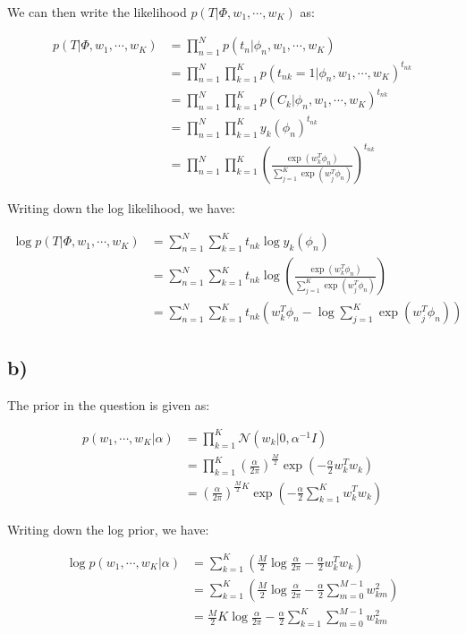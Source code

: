 \documentclass[12pt,a4paper,oneside]{paper}
\begin{document}
We can then write the likelihood $p(T | \Phi, w_1, \cdots, w_K)$ as:

\begin{align*}
    p(T | \Phi, w_1, \cdots, w_K) &= \prod_{n=1}^{N} p(t_n | \phi_n, w_1, \cdots, w_K) \\
    &= \prod_{n=1}^{N} \prod_{k=1}^{K} p(t_{nk} = 1 | \phi_n, w_1, \cdots, w_K)^{t_{nk}} \\
    &= \prod_{n=1}^{N} \prod_{k=1}^{K} p(C_k | \phi_n, w_1, \cdots, w_K)^{t_{nk}} \\
    &= \prod_{n=1}^{N} \prod_{k=1}^{K} y_k(\phi_n)^{t_{nk}} \\
    &= \prod_{n=1}^{N} \prod_{k=1}^{K} \left(\frac{\exp(w_k^T \phi_n)}{\sum_{j=1}^{K} \exp(w_j^T \phi_n)}\right)^{t_{nk}}
\end{align*}

Writing down the log likelihood, we have:

\begin{align*}
    \log p(T | \Phi, w_1, \cdots, w_K) &= \sum_{n=1}^{N} \sum_{k=1}^{K} t_{nk} \log y_k(\phi_n) \\
    &= \sum_{n=1}^{N} \sum_{k=1}^{K} t_{nk} \log \left(\frac{\exp(w_k^T \phi_n)}{\sum_{j=1}^{K} \exp(w_j^T \phi_n)}\right) \\
    &= \sum_{n=1}^{N} \sum_{k=1}^{K} t_{nk} \left(w_k^T \phi_n - \log \sum_{j=1}^{K} \exp(w_j^T \phi_n)\right)
\end{align*}

\subsection{b)}

The prior in the question is given as: 

\begin{align*}
    p(w_1, \cdots, w_K | \alpha) &= \prod_{k=1}^{K} \mathcal{N}(w_k | 0, \alpha^{-1} I) \\
    &= \prod_{k=1}^{K} \left(\frac{\alpha}{2\pi}\right)^{\frac{M}{2}} \exp\left(-\frac{\alpha}{2} w_k^T w_k\right) \\
    &= \left(\frac{\alpha}{2\pi}\right)^{\frac{M}{2} K} \exp\left(-\frac{\alpha}{2} \sum_{k=1}^{K} w_k^T w_k\right)
\end{align*}

Writing down the log prior, we have:

\begin{align*}
    \log p(w_1, \cdots, w_K | \alpha) &= \sum_{k=1}^{K} \left(\frac{M}{2} \log \frac{\alpha}{2\pi} - \frac{\alpha}{2} w_k^T w_k\right) \\
    &= \sum_{k=1}^{K} \left(\frac{M}{2} \log \frac{\alpha}{2\pi} - \frac{\alpha}{2} \sum_{m=0}^{M - 1} w_{km}^2\right) \\
    &= \frac{M}{2} K \log \frac{\alpha}{2\pi} - \frac{\alpha}{2} \sum_{k=1}^{K} \sum_{m=0}^{M - 1} w_{km}^2
\end{align*}
\end{document}
